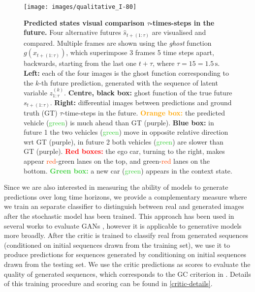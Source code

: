 \documentclass{article}
\begin{document}
\begin{figure}[t!]
  \centering
  \texttt{[image: images/qualitative\_I-80]}
  \caption{
    \textbf{Predicted states visual comparison $\tau$-times-steps in the future.}
    Four alternative futures $\hat{s}_{t+(1:\tau)}$ are visualised and compared.
    Multiple frames are shown using the \emph{ghost} function $g(x_{t+(1:\tau)})$, which superimpose 3 frames 5 time steps apart, backwards, starting from the last one $t + \tau$, where $\tau = 15 = 1.5\,\text{s}$.
    \textbf{Left:} each of the four images is the ghost function corresponding to the $k$-th future prediction, generated with the sequence of latent variable $z_{1:\tau}^{(k)}$.
    \textbf{Centre, black box:} ghost function of the true future $s_{t+(1:\tau)}$.
    \textbf{Right:} differential images between predictions  and ground truth (GT) $\tau$-time-steps in the future.
    \textcolor{Orange}{\textbf{Orange box:}} the predicted vehicle (\textcolor{LimeGreen}{green}) is much ahead than GT (\textcolor{Mulberry}{purple}).
    \textcolor{ProcessBlue}{\textbf{Blue box:}} in future 1 the two vehicles (\textcolor{LimeGreen}{green}) move in opposite relative direction wrt GT (\textcolor{Mulberry}{purple}), in future 2 both vehicles (\textcolor{LimeGreen}{green}) are slower than GT (\textcolor{Mulberry}{purple}).
    \textcolor{Red}{\textbf{Red boxes:}} the ego car, turning to the right, makes appear \textcolor{OrangeRed}{red}-\textcolor{PineGreen}{green} lanes on the top, and \textcolor{PineGreen}{green}-\textcolor{OrangeRed}{red} lanes on the bottom.
    \textcolor{LimeGreen}{\textbf{Green box:}} a new car (\textcolor{LimeGreen}{green}) appears in the context state.
  }
  \label{I-80_qual}
\end{figure}

Since we are also interested in measuring the ability of models to generate predictions over long time horizons, we provide a complementary measure where we train an separate classifier to distinguish between real and generated images after the stochastic model has been trained.
This approach has been used in several works to evaluate GANs \citep{Danihelka17, Rosca17, GANeval}, however it is applicable to generative models more broadly.
After the critic is trained to classify real from generated sequences (conditioned on initial sequences drawn from the training set), we use it to produce predictions for sequences generated by conditioning on initial sequences drawn from the testing set.
We use the critic predictions as scores to evaluate the quality of generated sequences, which corresponds to the GC criterion in \citep{GANeval}.
Details of this training procedure and scoring can be found in \cref{critic-details}.
\end{document}
